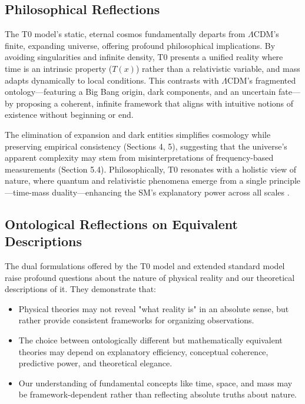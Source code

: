 \documentclass[twocolumn,aps,prl]{revtex4-2}
\newcommand{\Tfield}{T(x)}
\begin{document}
	\subsection{Philosophical Reflections}
	\label{subsec:philosophical_reflections}
	
	The T0 model's static, eternal cosmos fundamentally departs from \(\Lambda\)CDM's finite, expanding universe, offering profound philosophical implications. By avoiding singularities and infinite density, T0 presents a unified reality where time is an intrinsic property (\(\Tfield\)) rather than a relativistic variable, and mass adapts dynamically to local conditions. This contrasts with \(\Lambda\)CDM's fragmented ontology—featuring a Big Bang origin, dark components, and an uncertain fate—by proposing a coherent, infinite framework that aligns with intuitive notions of existence without beginning or end.
	
	The elimination of expansion and dark entities simplifies cosmology while preserving empirical consistency (Sections 4, 5), suggesting that the universe's apparent complexity may stem from misinterpretations of frequency-based measurements (Section 5.4). Philosophically, T0 resonates with a holistic view of nature, where quantum and relativistic phenomena emerge from a single principle—time-mass duality—enhancing the SM's explanatory power across all scales \cite{pascher_perspective_2025}.
	
	\subsection{Ontological Reflections on Equivalent Descriptions}
	\label{subsec:ontological_reflections}
	
	The dual formulations offered by the T0 model and extended standard model raise profound questions about the nature of physical reality and our theoretical descriptions of it. They demonstrate that:
	
	\begin{itemize}
		\item Physical theories may not reveal "what reality is" in an absolute sense, but rather provide consistent frameworks for organizing observations.
		\item The choice between ontologically different but mathematically equivalent theories may depend on explanatory efficiency, conceptual coherence, predictive power, and theoretical elegance.
		\item Our understanding of fundamental concepts like time, space, and mass may be framework-dependent rather than reflecting absolute truths about nature.
	\end{itemize}
	
\end{document}

